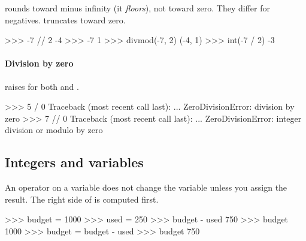 \begin{trap}
\code{//} rounds toward minus infinity (it \emph{floors}), not toward zero. They differ for negatives.
 truncates toward zero.
\begin{center}
\end{center}
\begin{pycode}
>>> -7 // 2
-4
>>> -7 %
1
>>> divmod(-7, 2)
(-4, 1)
>>> int(-7 / 2)
-3
\end{pycode}
\end{trap}

\paragraph{Division by zero} raises  for both \code{/} and \code{//}.

\begin{pycode}
>>> 5 / 0
Traceback (most recent call last):
  ...
ZeroDivisionError: division by zero
>>> 7 // 0
Traceback (most recent call last):
  ...
ZeroDivisionError: integer division or modulo by zero
\end{pycode}

\subsection{Integers and variables}

An operator on a variable does not change the variable unless you assign the result.
The right side of \code{=} is computed first.

\begin{pycode}
>>> budget = 1000
>>> used = 250
>>> budget - used
750
>>> budget
1000
>>> budget = budget - used
>>> budget
750
\end{pycode}


